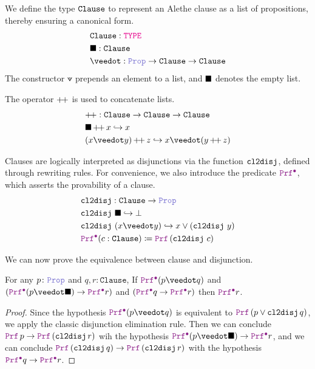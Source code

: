 \begin{definition}\label{def:encoding-clause}
We define the type $\texttt{\upshape{Clause}}$ to represent an Alethe clause as a list of propositions, thereby ensuring a canonical form.
\begin{align*}
&\texttt{Clause}: \type \\
&\nil: \texttt{Clause} \\
&\veedot: \prop \ra \texttt{Clause}  \ra \texttt{Clause}
\end{align*}
The constructor $\veedot$ prepends an element to a list, and $\blacksquare$ denotes the empty list.
\end{definition}

\begin{definition}
The operator $ {+}\!{+} $ is used to concatenate lists.
\begin{align*}
& \pp: \texttt{Clause} \ra \texttt{Clause} \ra \texttt{Clause} \\
& \nil \mathop{\pp} x \re x \\
& (x \veedot y) \mathop{\pp} z \re x \veedot (y \mathop{\pp} z)
\end{align*}
\end{definition}

\begin{definition}
Clauses are logically interpreted as disjunctions via the function $\texttt{\upshape{cl2disj}}$, defined through rewriting rules. For convenience, we also introduce the predicate $\pid$, which asserts the provability of a clause.
\begin{align*}
& \kw{cl2disj}: \texttt{Clause} \ra \prop \\
& \cltodisj~\nil \re \bot\\
& \cltodisj~(x \veedot y) \re x \lor (\cltodisj~y) \\
& \pid (c : \texttt{Clause}) \coloneqq \prf\,(\cltodisj~c)
\end{align*}
\end{definition}

We can now prove the equivalence between clause and disjunction.

\begin{lemma}\label{lemma:clause-elim}
For any $p \colon \prop$ and $q,r \colon \texttt{Clause}$, If $\pid (p \veedot q)$ and $(\pid (p \veedot \nil) \ra  \pid r)$ and $(\pid q \ra  \pid r)$ then $\pid r$.
\end{lemma}
\begin{proof}
Since the hypothesis $\pid (p \veedot q)$ is equivalent to $\prf\,(p \lor \cltodisj\,q)$, we apply the classic disjunction elimination rule.
Then we can conclude $\prf\,p \ra \prf\,(\cltodisj\,r)$ wih the hypothesis $\pid (p \veedot \nil) \ra  \pid r$, and we can conclude $\prf\,(\cltodisj\,q) \ra \prf\,(\cltodisj\,r)$
with the hypothesis $\pid q \ra  \pid r$.
\end{proof}

